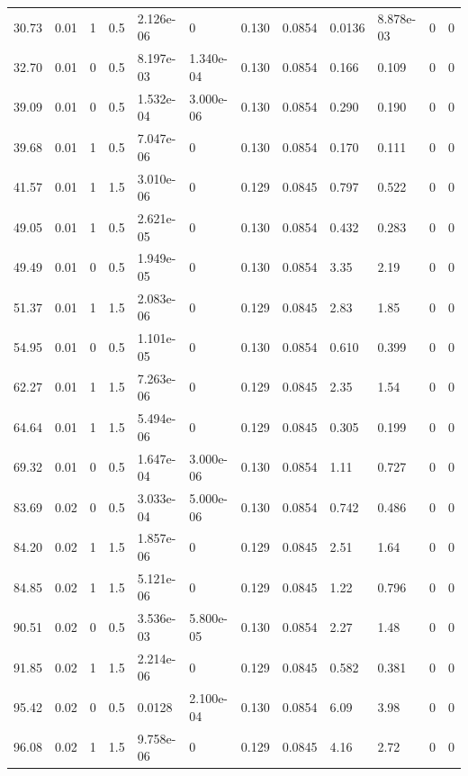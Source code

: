 \documentclass[preview]{standalone}
\begin{document}
{{\begin{tabular}{L{1.2cm}C{1.2cm} C{0.3cm}C{0.5cm} C{1.4cm}C{1.4cm} C{1.4cm}C{1.4cm} C{1.6cm}C{1.6cm} C{1.6cm}C{1.6cm}}
  30.73  &  0.01  & 1     & 0.5 &  2.126e-06  & 0  &  0.130&   0.0854& 0.0136 & 8.878e-03   &  0 & 0  \\ 
  32.70  &  0.01  & 0     & 0.5 &  8.197e-03  & 1.340e-04  &  0.130&   0.0854& 0.166 & 0.109   &  0 & 0  \\ 
  39.09  &  0.01  & 0     & 0.5 &  1.532e-04  & 3.000e-06  &  0.130&   0.0854& 0.290 & 0.190   &  0 & 0  \\ 
  39.68  &  0.01  & 1     & 0.5 &  7.047e-06  & 0  &  0.130&   0.0854& 0.170 & 0.111   &  0 & 0  \\ 
  41.57  &  0.01  & 1     & 1.5 &  3.010e-06  & 0  &  0.129&   0.0845& 0.797 & 0.522   &  0 & 0  \\ 
  49.05  &  0.01  & 1     & 0.5 &  2.621e-05  & 0  &  0.130&   0.0854& 0.432 & 0.283   &  0 & 0  \\ 
  49.49  &  0.01  & 0     & 0.5 &  1.949e-05  & 0  &  0.130&   0.0854& 3.35 & 2.19   &  0 & 0  \\ 
  51.37  &  0.01  & 1     & 1.5 &  2.083e-06  & 0  &  0.129&   0.0845& 2.83 & 1.85   &  0 & 0  \\ 
  54.95  &  0.01  & 0     & 0.5 &  1.101e-05  & 0  &  0.130&   0.0854& 0.610 & 0.399   &  0 & 0  \\ 
  62.27  &  0.01  & 1     & 1.5 &  7.263e-06  & 0  &  0.129&   0.0845& 2.35 & 1.54   &  0 & 0  \\ 
  64.64  &  0.01  & 1     & 1.5 &  5.494e-06  & 0  &  0.129&   0.0845& 0.305 & 0.199   &  0 & 0  \\ 
  69.32  &  0.01  & 0     & 0.5 &  1.647e-04  & 3.000e-06  &  0.130&   0.0854& 1.11 & 0.727   &  0 & 0  \\ 
  83.69  &  0.02  & 0     & 0.5 &  3.033e-04  & 5.000e-06  &  0.130&   0.0854& 0.742 & 0.486   &  0 & 0  \\ 
  84.20  &  0.02  & 1     & 1.5 &  1.857e-06  & 0  &  0.129&   0.0845& 2.51 & 1.64   &  0 & 0  \\ 
  84.85  &  0.02  & 1     & 1.5 &  5.121e-06  & 0  &  0.129&   0.0845& 1.22 & 0.796   &  0 & 0  \\ 
  90.51  &  0.02  & 0     & 0.5 &  3.536e-03  & 5.800e-05  &  0.130&   0.0854& 2.27 & 1.48   &  0 & 0  \\ 
  91.85  &  0.02  & 1     & 1.5 &  2.214e-06  & 0  &  0.129&   0.0845& 0.582 & 0.381   &  0 & 0  \\ 
  95.42  &  0.02  & 0     & 0.5 &  0.0128  & 2.100e-04  &  0.130&   0.0854& 6.09 & 3.98   &  0 & 0  \\ 
  96.08  &  0.02  & 1     & 1.5 &  9.758e-06  & 0  &  0.129&   0.0845& 4.16 & 2.72   &  0 & 0  \\ 

\end{tabular}}}
\end{document}
